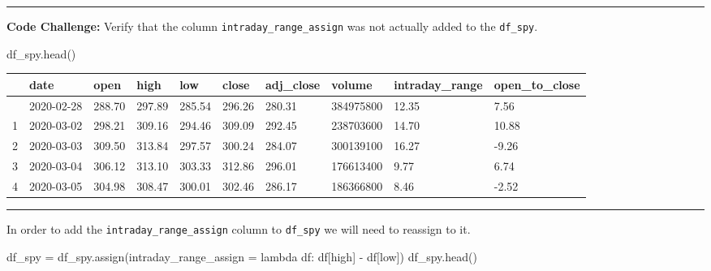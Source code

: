 \documentclass[
  letterpaper,
  DIV=11,
  numbers=noendperiod]{scrreprt}
\newenvironment{Shaded}{\begin{snugshade}}{\end{snugshade}}
\newcommand{\KeywordTok}[1]{\textcolor[rgb]{0.00,0.23,0.31}{#1}}
\newcommand{\NormalTok}[1]{\textcolor[rgb]{0.00,0.23,0.31}{#1}}
\newcommand{\OperatorTok}[1]{\textcolor[rgb]{0.37,0.37,0.37}{#1}}
\newcommand{\StringTok}[1]{\textcolor[rgb]{0.13,0.47,0.30}{#1}}
\begin{document}
\begin{center}\rule{0.5\linewidth}{0.5pt}\end{center}

\textbf{Code Challenge:} Verify that the column
\texttt{intraday\_range\_assign} was not actually added to the
\texttt{df\_spy}.

\begin{Shaded}
\begin{Highlighting}[]
\NormalTok{df\_spy.head()}
\end{Highlighting}
\end{Shaded}

\begin{longtable}[]{@{}llllllllll@{}}
\toprule\noalign{}
& date & open & high & low & close & adj\_close & volume &
intraday\_range & open\_to\_close \\
\midrule\noalign{}
\endhead
\bottomrule\noalign{}
\endlastfoot
0 & 2020-02-28 & 288.70 & 297.89 & 285.54 & 296.26 & 280.31 & 384975800
& 12.35 & 7.56 \\
1 & 2020-03-02 & 298.21 & 309.16 & 294.46 & 309.09 & 292.45 & 238703600
& 14.70 & 10.88 \\
2 & 2020-03-03 & 309.50 & 313.84 & 297.57 & 300.24 & 284.07 & 300139100
& 16.27 & -9.26 \\
3 & 2020-03-04 & 306.12 & 313.10 & 303.33 & 312.86 & 296.01 & 176613400
& 9.77 & 6.74 \\
4 & 2020-03-05 & 304.98 & 308.47 & 300.01 & 302.46 & 286.17 & 186366800
& 8.46 & -2.52 \\
\end{longtable}

\begin{center}\rule{0.5\linewidth}{0.5pt}\end{center}

In order to add the \texttt{intraday\_range\_assign} column to
\texttt{df\_spy} we will need to reassign to it.

\begin{Shaded}
\begin{Highlighting}[]
\NormalTok{df\_spy }\OperatorTok{=}\NormalTok{ df\_spy.assign(intraday\_range\_assign }\OperatorTok{=} \KeywordTok{lambda}\NormalTok{ df: df[}\StringTok{\textquotesingle{}high\textquotesingle{}}\NormalTok{] }\OperatorTok{{-}}\NormalTok{ df[}\StringTok{\textquotesingle{}low\textquotesingle{}}\NormalTok{])}
\NormalTok{df\_spy.head()}
\end{Highlighting}
\end{Shaded}
\end{document}
